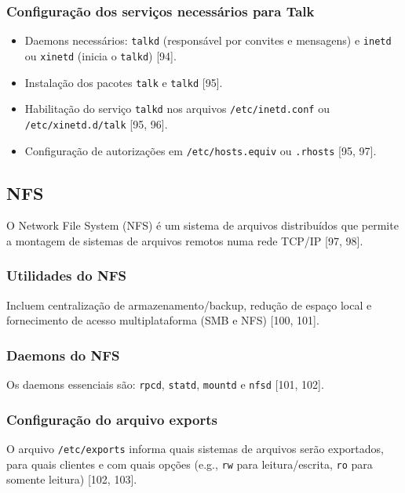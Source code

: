 \documentclass[12pt, a4paper]{article}
\begin{document}
	\subsubsection{Configuração dos serviços necessários para Talk} %
	\begin{itemize}
		\item Daemons necessários: \texttt{talkd} (responsável por convites e mensagens) e \texttt{inetd} ou \texttt{xinetd} (inicia o \texttt{talkd}) [94].
		\item Instalação dos pacotes \texttt{talk} e \texttt{talkd} [95].
		\item Habilitação do serviço \texttt{talkd} nos arquivos \texttt{/etc/inetd.conf} ou \texttt{/etc/xinetd.d/talk} [95, 96].
		\item Configuração de autorizações em \texttt{/etc/hosts.equiv} ou \texttt{.rhosts} [95, 97].
	\end{itemize}
	
	\subsection{NFS} %
	O Network File System (NFS) é um sistema de arquivos distribuídos que permite a montagem de sistemas de arquivos remotos numa rede TCP/IP [97, 98].
	
	\subsubsection{Utilidades do NFS} %
	Incluem centralização de armazenamento/backup, redução de espaço local e fornecimento de acesso multiplataforma (SMB e NFS) [100, 101].
	
	\subsubsection{Daemons do NFS} %
	Os daemons essenciais são: \texttt{rpcd}, \texttt{statd}, \texttt{mountd} e \texttt{nfsd} [101, 102].
	
	\subsubsection{Configuração do arquivo exports} %
	O arquivo \texttt{/etc/exports} informa quais sistemas de arquivos serão exportados, para quais clientes e com quais opções (e.g., \texttt{rw} para leitura/escrita, \texttt{ro} para somente leitura) [102, 103].
	
\end{document}
